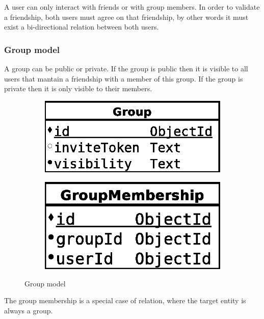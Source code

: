A user can only interact with friends or with group members. In order to validate a friendship, both users must agree on that friendship, by other words it must exist a bi-directional relation between both users.

\subsubsection{Group model}

A group can be public or private. If the group is public then it is visible to all users that mantain a friendship with a member of this group. If the group is private then it is only visible to their members.

\begin{figure}[H]
    \centering
    \begin{subfigure}[b]{0.30\textwidth}
    	\includegraphics[width=\textwidth]{figures/model_group}
    \end{subfigure}
    \begin{subfigure}[b]{0.25\textwidth}
    	\includegraphics[width=\textwidth]{figures/model_group_membership}
    \end{subfigure}
    \caption{Group model}
\end{figure} 

The group membership is a special case of relation, where the target entity is always a group.


